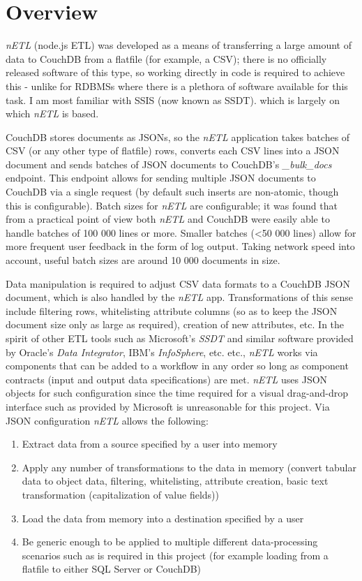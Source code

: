 \section{Overview}
\textit{nETL} (node.js ETL) was developed as a means of transferring a large amount of data to CouchDB from a flatfile (for example, a CSV); there is no officially released software of this type, so working directly in code is required to achieve this - unlike for RDBMSs where there is a plethora of software available for this task. I am most familiar with SSIS (now known as SSDT). which is largely on which \textit{nETL} is based.

CouchDB stores documents as JSONs, so the \textit{nETL} application takes batches of CSV (or any other type of flatfile) rows, converts each CSV lines into a JSON document and sends batches of JSON documents to CouchDB's \textit{\_bulk\_docs} endpoint. This endpoint allows for sending multiple JSON documents to CouchDB via a single request (by default such inserts are non-atomic, though this is configurable). Batch sizes for \textit{nETL} are configurable; it was found that from a practical point of view both \textit{nETL} and CouchDB were easily able to handle batches of 100 000 lines or more. Smaller batches (\textless 50 000 lines) allow for more frequent user feedback in the form of log output. Taking network speed into account, useful batch sizes are around 10 000 documents in size.

Data manipulation is required to adjust CSV data formats to a CouchDB JSON document, which is also handled by the \textit{nETL} app. Transformations of this sense include filtering rows, whitelisting attribute columns (so as to keep the JSON document size only as large as required), creation of new attributes, etc. In the spirit of other ETL tools such as Microsoft's \textit{SSDT} and similar software provided by Oracle's \textit{Data Integrator}, IBM's \textit{InfoSphere}, etc. etc., \textit{nETL} works via components that can be added to a workflow in any order so long as component contracts (input and output data specifications) are met. \textit{nETL} uses JSON objects for such configuration since the time required for a visual drag-and-drop interface such as provided by Microsoft is unreasonable for this project. Via JSON configuration \textit{nETL} allows the following:

\begin{enumerate}
    \item Extract data from a source specified by a user into memory
    \item Apply any number of transformations to the data in memory (convert tabular data to object data, filtering, whitelisting, attribute creation, basic text transformation (capitalization of value fields))
    \item Load the data from memory into a destination specified by a user
    \item Be generic enough to be applied to multiple different data-processing scenarios such as is required in this project (for example loading from a flatfile to either SQL Server or CouchDB)
\end{enumerate}